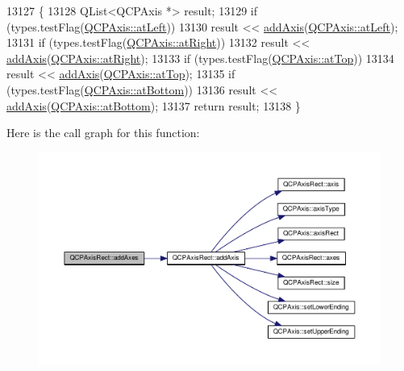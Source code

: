 \begin{DoxyCode}
13127                                                             \{
13128   QList<QCPAxis *> result;
13129   \textcolor{keywordflow}{if} (types.testFlag(\hyperlink{class_q_c_p_axis_ae2bcc1728b382f10f064612b368bc18aaf84aa6cac6fb6099f54a2cbf7546b730}{QCPAxis::atLeft}))
13130     result << \hyperlink{class_q_c_p_axis_rect_a2dc336092ccc57d44a46194c8a23e4f4}{addAxis}(\hyperlink{class_q_c_p_axis_ae2bcc1728b382f10f064612b368bc18aaf84aa6cac6fb6099f54a2cbf7546b730}{QCPAxis::atLeft});
13131   \textcolor{keywordflow}{if} (types.testFlag(\hyperlink{class_q_c_p_axis_ae2bcc1728b382f10f064612b368bc18aadf5509f7d29199ef2f263b1dd224b345}{QCPAxis::atRight}))
13132     result << \hyperlink{class_q_c_p_axis_rect_a2dc336092ccc57d44a46194c8a23e4f4}{addAxis}(\hyperlink{class_q_c_p_axis_ae2bcc1728b382f10f064612b368bc18aadf5509f7d29199ef2f263b1dd224b345}{QCPAxis::atRight});
13133   \textcolor{keywordflow}{if} (types.testFlag(\hyperlink{class_q_c_p_axis_ae2bcc1728b382f10f064612b368bc18aac0ece2b680d3f545e701f75af1655977}{QCPAxis::atTop}))
13134     result << \hyperlink{class_q_c_p_axis_rect_a2dc336092ccc57d44a46194c8a23e4f4}{addAxis}(\hyperlink{class_q_c_p_axis_ae2bcc1728b382f10f064612b368bc18aac0ece2b680d3f545e701f75af1655977}{QCPAxis::atTop});
13135   \textcolor{keywordflow}{if} (types.testFlag(\hyperlink{class_q_c_p_axis_ae2bcc1728b382f10f064612b368bc18aa220d68888516b6c3b493d144f1ba438f}{QCPAxis::atBottom}))
13136     result << \hyperlink{class_q_c_p_axis_rect_a2dc336092ccc57d44a46194c8a23e4f4}{addAxis}(\hyperlink{class_q_c_p_axis_ae2bcc1728b382f10f064612b368bc18aa220d68888516b6c3b493d144f1ba438f}{QCPAxis::atBottom});
13137   \textcolor{keywordflow}{return} result;
13138 \}
\end{DoxyCode}


Here is the call graph for this function\+:\nopagebreak
\begin{figure}[H]
\begin{center}
\leavevmode
\includegraphics[width=350pt]{class_q_c_p_axis_rect_a792e1f3d9cb1591fca135bb0de9b81fc_cgraph}
\end{center}
\end{figure}


